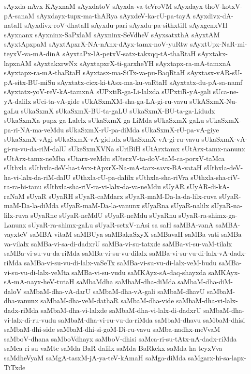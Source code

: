 {sAyxda-nAvx-KAyxnaM
sAyxdatoV
sAyxda-va-teVroVM
sAyxdayx-thoV-kotxV-pA-sanaM
sAyxdayx-tupx-ma-thARya
sAyxdeV-ka-rU-pa-tayA
sAyxdivx-dA-nataH
sAyxdivx-roV-dhataH
sAyxdu-pari
sAyxdu-pa-sithxtiH
sAyxgenxVH
sAyxnanx
sAyxninx-SaPxlaM
sAyxninx-SeVdheV
sAyxsatxthA
sAyxtAM
sAyxtApxpaM
sAyxtApxrX-NA-nAnx-dAyx-tamx-noV-yuRtw
sAyxtUpx-NaR-mi-teyxV-va-mA-dinA
sAyxtaPx-lA-petxV-satx-takxqq-tA-thaRtaH
sAyxtakx-lapxnAM
sAyxtakxrwNx
sAyxtapxrX-ti-garxheYH
sAyxtapx-ra-mA-tamxnA
sAyxtapx-ra-mA-thaRtaH
sAyxtasx-ma-SiTx-va-pu-BaqRtaH
sAyxtasx-vAR-sU-pA-sitx-BU-miSu
sAyxtatx-cicx-ki-tAsx-ma-ku-vaRtaH
sAyxtatx-du-pA-sa-namf
sAyxtatx-yoV-reV-kA-tamxnA
sUPxtiR-ga-Li-lalxda
sUPxtiR-yA-gali
sUca-ne-yA-dalilx
sUci-ta-vA-gide
sUkASxmXM-sha-ga-LA-gi-ru-vavu
sUkASxmX-Nu-gaLu
sUkaSxmX
sUkaSxmX-BU-ta-gaLU
sUkaSxmX-BU-ta-ga-Lidudx
sUkaSxmXa-pupx-ga-Lalelx
sUkaSxmX-ga-LiMda
sUkaSxmX-gaLu
sUkaSxmX-pa-ri-NA-ma-veMdu
sUkaSxmX-rU-pa-diMda
sUkaSxmX-rU-pa-vA-giye
sUkaSxmX-vAgi
sUkaSxmX-vA-gidudx
sUkaSxmX-vA-gi-ru-vavu
sUkaSxmX-vA-gi-ru-vu-da-riM-dalU
sUkeSxmXVNa
sUriBiH
sUtArxtamx
sUtArx-tamx-nanunx
sUtArx-tamx-neMba
sUtarx-veMdu
sUterxV-ta-doV-taM-ca-porxV-taMca
sUthxla
sUthxla-deV-ha-tAvx-tApxrX-Na-mA-tarx-savx-BA-vataH
sUthxla-deV-ha-vi-lalx-da-riM-dalU
sUthxla-rU-pa-dalilx
sUthxla-sha-riVra
sUthxla-sha-riV-ra-ra-hi-tanu
sUthxla-sha-riV-ra-vi-lalx-da-va-neMdu
sUyAR
sUyAR-di-kA-raNaM
sUyaR
sUyaRH
sUyaR-caMdarx
sUyaR-maM-Da-la-da-lilx-ruva
sUyaR-maM-Da-la-diMda
sUyaR-maM-Da-la-vanunx
sUyaRna
sUyaR-nalilx
sUyaR-na-lilx-ruva
sUyaRne
sUyaR-neMdU
sUyaR-neMdu
sUyaRnu
sUyaR-ra-shimx-ga-Lanunx
sUyaR-ra-shimx-gaLu
sUyaR-setxV-nAsi
sa
saH
saMBA-vanA
saMBA-vayxteV
saMBA-vitaM
saMBUya
saMBakaSxyX
saMBavaH
saMBa-vati
saMBa-va-vilalx
saMBa-vi-sa-di-dadxrU
saMBa-vi-su-tatxde
saMBa-vi-su-vaM-tilalx
saMBa-vi-su-vu-da-riMda
saMBa-vi-su-vu-dilalx
saMBa-vi-su-vu-di-lalx-vA-dadx-riMda
saMBa-vi-su-vu-di-lalx-vaSeTx
saMBa-vi-su-vu-di-lalx-veM-budu
saMBa-vi-su-vu-di-lalx-veMta
saMBa-vi-su-vudu
saMKAyx-sA-daq-shayxda
saMKAyx-sA-mA-nayx-heV-tutaH
saMbaMdha
saMbaM-dha-diMda
saMbaM-dha-diM-daloV
saMbaM-dha-vA-darU
saMbaM-dha-vA-gali
saMbaM-dhavU
saMbaM-dha-vanunx
saMbaM-dha-veM-dathaR
saMbaM-dha-vide
saMbaM-dha-vi-lalx-dadx-riMda
saMbaM-dha-vi-lalxde
saMbaM-dha-vi-lalx-di-dadxrU
saMbaM-dha-vi-lalx-di-ru-vudu
saMbaM-dha-vi-ru-vu-da-riMda
saMbaM-dhavu
saMbaM-dhisi
saMbaM-dhi-side
saMbaM-dhi-si-goM-Di-ru-vavu
saMba-nadhx-meVvaM
saMboV-dhana
saMboVdhayx
saMboV-dhisi
saMca-ri-su-tAtx-nA-dadx-riMda
saMca-ri-su-vaMte
saMda-BaR-dalilx
saMda-BaRkekx
saMda-ha-teyxVva
saMdheVyaM
saMgA-tasxM-jA-ya-teV-kAmaH
saMga-diMda
saMgarx-hi-sa-lapx-TiTxde
}
